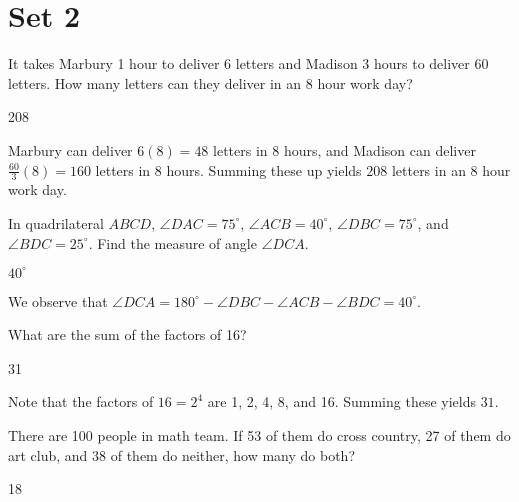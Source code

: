 \documentclass[11pt]{article}
\begin{document}
\section*{Set 2}
\begin{problem}
It takes Marbury 1 hour to deliver 6 letters and Madison 3 hours to deliver 60 letters. How many letters can they deliver in an 8 hour work day?
\end{problem}

\begin{answer}
208
\end{answer}

\begin{solution}
Marbury can deliver $6(8)=48$ letters in 8 hours, and Madison can deliver $\frac{60}{3}(8)=160$ letters in 8 hours. Summing these up yields $\boxed{208}$ letters in an 8 hour work day.
\end{solution}

\begin{problem}
In quadrilateral $ABCD$, $\angle DAC = 75^\circ$, $\angle ACB = 40^\circ$, $\angle DBC = 75^\circ$, and $\angle BDC = 25^\circ$. Find the measure of angle $\angle DCA$.
\end{problem}

\begin{answer}
$40^\circ$
\end{answer}

\begin{solution}
We observe that $\angle DCA = 180^\circ - \angle DBC - \angle ACB - \angle BDC = 40^\circ$.
\end{solution}

\begin{problem}
What are the sum of the factors of 16?
\end{problem}

\begin{answer}
31
\end{answer}

\begin{solution}
Note that the factors of $16=2^4$ are 1, 2, 4, 8, and 16. Summing these yields $31$.
\end{solution}

\begin{problem}
There are 100 people in math team. If 53 of them do cross country, 27 of them do art club, and 38 of them do neither, how many do both?
\end{problem}

\begin{answer}
18
\end{answer}
\end{document}
